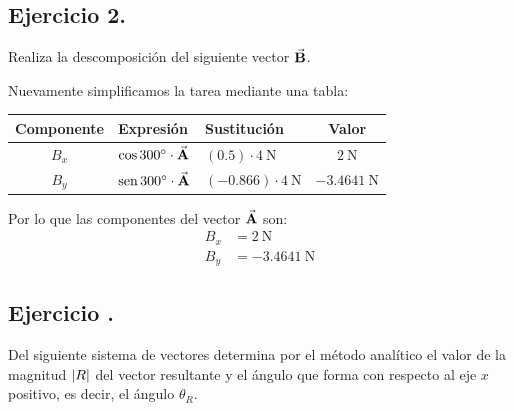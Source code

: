 \documentclass[14pt]{extarticle}
\renewcommand{\sin}{\operatorname{sen}}
\begin{document}
\subsection{Ejercicio 2.}

Realiza la descomposición del siguiente vector $\va{B}$.
\begin{figure}[H]
    \centering
\end{figure}

Nuevamente simplificamos la tarea mediante una tabla:
\begin{table}[H]
\centering
\begin{tabular}{c | l | l | c}
Componente & Expresión & Sustitución & Valor \\ \hline
$B_{x}$ & $\cos \ang{300} \cdot \va{A}$ & $(0.5) \cdot \SI{4}{\newton}$ & $\SI{2}{\newton}$ \\ \hline
$B_{y}$ & $\sin \ang{300} \cdot \va{A}$ & $(-0.866) \cdot \SI{4}{\newton}$ & $\SI{-3.4641}{\newton}$ \\ \hline
\end{tabular}
\end{table}
Por lo que las componentes del vector $\va{A}$ son:
\begin{align*}
B_{x} &= \SI{2}{\newton} \\
B_{y} &= \SI{-3.4641}{\newton}
\end{align*}

\subsection{Ejercicio .}

Del siguiente sistema de vectores determina por el método analítico el valor de la magnitud $\abs{R}$ del vector resultante y el ángulo que forma con respecto al eje $x$ positivo, es decir, el ángulo $\theta_{R}$.
\end{document}
